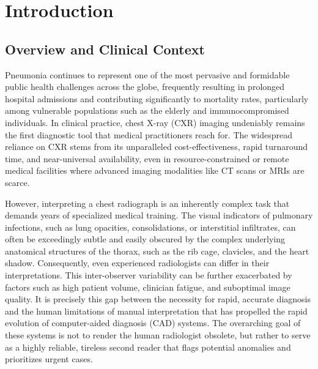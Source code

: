 \documentclass[12pt,a4paper]{report}
\begin{document}
\justifying
{}
\chapter{Introduction}

\section{Overview and Clinical Context}

Pneumonia continues to represent one of the most pervasive and formidable public health challenges across the globe, frequently resulting in prolonged hospital admissions and contributing significantly to mortality rates, particularly among vulnerable populations such as the elderly and immunocompromised individuals. In clinical practice, chest X-ray (CXR) imaging undeniably remains the first diagnostic tool that medical practitioners reach for. The widespread reliance on CXR stems from its unparalleled cost-effectiveness, rapid turnaround time, and near-universal availability, even in resource-constrained or remote medical facilities where advanced imaging modalities like CT scans or MRIs are scarce.

However, interpreting a chest radiograph is an inherently complex task that demands years of specialized medical training. The visual indicators of pulmonary infections, such as lung opacities, consolidations, or interstitial infiltrates, can often be exceedingly subtle and easily obscured by the complex underlying anatomical structures of the thorax, such as the rib cage, clavicles, and the heart shadow. Consequently, even experienced radiologists can differ in their interpretations. This inter-observer variability can be further exacerbated by factors such as high patient volume, clinician fatigue, and suboptimal image quality. It is precisely this gap between the necessity for rapid, accurate diagnosis and the human limitations of manual interpretation that has propelled the rapid evolution of computer-aided diagnosis (CAD) systems. The overarching goal of these systems is not to render the human radiologist obsolete, but rather to serve as a highly reliable, tireless second reader that flags potential anomalies and prioritizes urgent cases.
\end{document}
